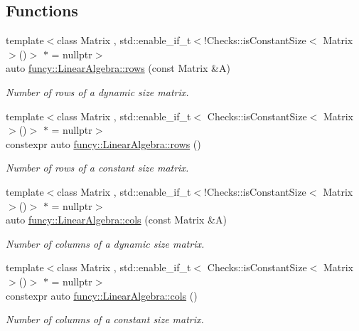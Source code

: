 \subsection*{Functions}
\begin{DoxyCompactItemize}
\item 
{\footnotesize template$<$class Matrix , std\-::enable\-\_\-if\-\_\-t$<$!\-Checks\-::is\-Constant\-Size$<$ Matrix $>$()$>$ $\ast$  = nullptr$>$ }\\auto \hyperlink{namespacefuncy_1_1LinearAlgebra_aea4d8c30f47543a340dd7d1efda08b6d}{funcy\-::\-Linear\-Algebra\-::rows} (const Matrix \&A)
\begin{DoxyCompactList}\small\item\em Number of rows of a dynamic size matrix. \end{DoxyCompactList}\item 
{\footnotesize template$<$class Matrix , std\-::enable\-\_\-if\-\_\-t$<$ Checks\-::is\-Constant\-Size$<$ Matrix $>$()$>$ $\ast$  = nullptr$>$ }\\constexpr auto \hyperlink{namespacefuncy_1_1LinearAlgebra_a565c19fd47b92c507d1497b77d188984}{funcy\-::\-Linear\-Algebra\-::rows} ()
\begin{DoxyCompactList}\small\item\em Number of rows of a constant size matrix. \end{DoxyCompactList}\item 
{\footnotesize template$<$class Matrix , std\-::enable\-\_\-if\-\_\-t$<$!\-Checks\-::is\-Constant\-Size$<$ Matrix $>$()$>$ $\ast$  = nullptr$>$ }\\auto \hyperlink{namespacefuncy_1_1LinearAlgebra_adee762dc2457194e15c0a5e678babcb2}{funcy\-::\-Linear\-Algebra\-::cols} (const Matrix \&A)
\begin{DoxyCompactList}\small\item\em Number of columns of a dynamic size matrix. \end{DoxyCompactList}\item 
{\footnotesize template$<$class Matrix , std\-::enable\-\_\-if\-\_\-t$<$ Checks\-::is\-Constant\-Size$<$ Matrix $>$()$>$ $\ast$  = nullptr$>$ }\\constexpr auto \hyperlink{namespacefuncy_1_1LinearAlgebra_ad7f8b93aee421acae43b75a8907fb3ef}{funcy\-::\-Linear\-Algebra\-::cols} ()
\begin{DoxyCompactList}\small\item\em Number of columns of a constant size matrix. \end{DoxyCompactList}\end{DoxyCompactItemize}
